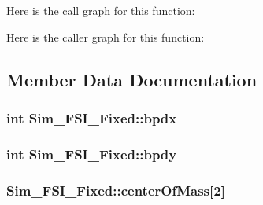 Here is the call graph for this function\+:




Here is the caller graph for this function\+:




\subsection{Member Data Documentation}
\hypertarget{class_sim___f_s_i___fixed_a719f3cc786db8b65eee89d2d96b5a200}{}
\subsubsection[{bpdx}]{\setlength{\rightskip}{0pt plus 5cm}int Sim\+\_\+\+F\+S\+I\+\_\+\+Fixed\+::bpdx\hspace{0.3cm}{\ttfamily [protected]}}\label{class_sim___f_s_i___fixed_a719f3cc786db8b65eee89d2d96b5a200}
\hypertarget{class_sim___f_s_i___fixed_a5c55ef58ef53121613d54da464771654}{}
\subsubsection[{bpdy}]{\setlength{\rightskip}{0pt plus 5cm}int Sim\+\_\+\+F\+S\+I\+\_\+\+Fixed\+::bpdy\hspace{0.3cm}{\ttfamily [protected]}}\label{class_sim___f_s_i___fixed_a5c55ef58ef53121613d54da464771654}
\hypertarget{class_sim___f_s_i___fixed_aadb42dd204f546f8bcf5dc3dbdad5d33}{}
\subsubsection[{center\+Of\+Mass}]{ Sim\+\_\+\+F\+S\+I\+\_\+\+Fixed\+::center\+Of\+Mass\mbox{[}2\mbox{]}\hspace{0.3cm}{\ttfamily [protected]}}\label{class_sim___f_s_i___fixed_aadb42dd204f546f8bcf5dc3dbdad5d33}
\hypertarget{class_sim___f_s_i___fixed_aac96337fe38ebde7c000b48e9cc8a5a9}{}
